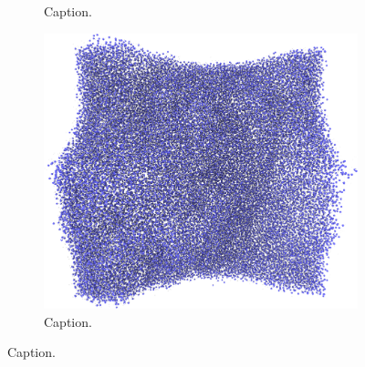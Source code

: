 \begin{figure}[htpb]
\begin{subfigure}[b]{\myfigwidth}
        \caption{Caption.}%
    \end{subfigure}%
    \hfill%
    \begin{subfigure}[b]{\myfigwidth}%
        \centering%
        \includegraphics[width=\textwidth]{images/systems/trimmed-rough_fracture05_06}%
        \caption{Caption.}%
    \end{subfigure}%
    \caption{%
        Caption. %
    }%
\end{figure}%

